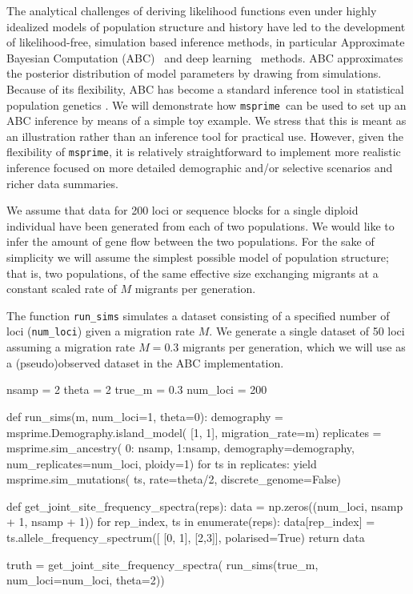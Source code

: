 \documentclass[graybox]{svmult}
\newcommand{\msprime}[0]{\texttt{msprime}}
\begin{document}
The analytical challenges of deriving likelihood functions even under
highly idealized models of population structure and history have led to
the development of likelihood-free, simulation based inference methods, in particular
Approximate Bayesian Computation (ABC)~\citep{Beaumont2002} and deep learning~\cite{korfmann2023deep} methods.
ABC approximates the posterior distribution of model parameters by drawing from
simulations. Because of its flexibility, ABC has become a standard
inference tool in statistical population genetics \citep[see][for a review]{csillery2010approximate}.
We will demonstrate how \msprime\ can be used to set up an ABC inference
by means of a simple toy example. We stress that this is meant as an
illustration rather than an inference tool for practical use. However,
given the flexibility of \msprime, it is
relatively straightforward to implement more realistic inference focused
on more detailed demographic and/or selective scenarios and richer data summaries.

We assume that data for 200 loci or sequence blocks
for a single diploid individual have been generated
from each of two populations. We would like to infer the amount of gene
flow between the two populations. For the sake of simplicity we will
assume the simplest possible model of population structure; that is, two
populations, of the same effective size exchanging migrants at a
constant scaled rate of \(M\) migrants per generation.

The function \texttt{run\_sims} simulates a dataset consisting of a
specified number of loci (\texttt{num\_loci}) given a migration rate
\(M\). We generate a single dataset of 50 loci assuming a migration rate
\(M=0.3\) migrants per generation, which we will use as a (pseudo)observed dataset in the ABC
implementation.

\begin{pythoncode}
nsamp = 2
theta = 2
true_m = 0.3
num_loci = 200

def run_sims(m, num_loci=1, theta=0):
    demography = msprime.Demography.island_model(
        [1, 1], migration_rate=m)
    replicates = msprime.sim_ancestry(
        {0: nsamp, 1:nsamp}, demography=demography,
        num_replicates=num_loci, ploidy=1)
    for ts in replicates:
        yield msprime.sim_mutations(
            ts, rate=theta/2, discrete_genome=False)

def get_joint_site_frequency_spectra(reps):
    data = np.zeros((num_loci, nsamp + 1, nsamp + 1))
    for rep_index, ts in enumerate(reps):
        data[rep_index] = ts.allele_frequency_spectrum([
            [0, 1], [2,3]], polarised=True)
    return data

truth = get_joint_site_frequency_spectra(
    run_sims(true_m, num_loci=num_loci, theta=2))
\end{pythoncode}
\end{document}
